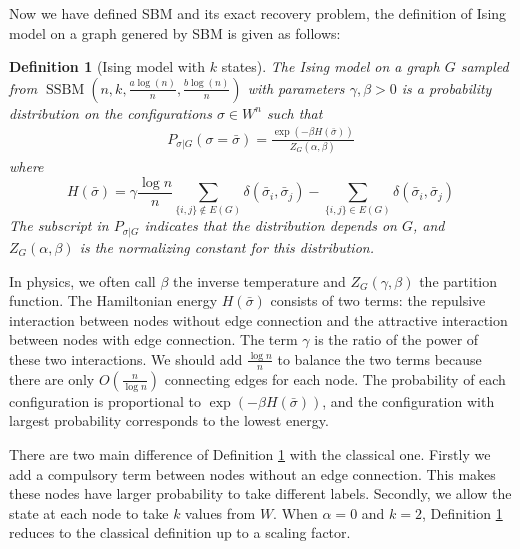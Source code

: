\documentclass[journal]{IEEEtran}
\newtheorem{definition}{Definition}
\newcommand{\A}{\frac{a \log(n)}{n}}
\newcommand{\B}{\frac{b \log(n)}{n}}
\newcommand{\1}{\mathbbm{1}}
\DeclareMathOperator{\SSBM}{SSBM}
\begin{document}
Now we have defined SBM and its exact recovery problem, the definition of Ising model on a graph genered by SBM is given
as follows:
\begin{definition}[Ising model with $k$ states]\label{def:ising}
	The Ising model on a graph $G$ sampled from $\SSBM(n,k,\A,\B)$ with parameters $\gamma,\beta>0$ is a probability distribution on the configurations $\sigma\in W^n$ such that
	\begin{align} \label{eq:isingma}
	P_{\sigma|G}(\sigma=\bar{\sigma})=\frac{\exp(-\beta H(\bar{\sigma}))}{Z_G(\alpha,\beta)}
	\end{align}
	where
	\begin{equation}\label{eq:energy}
	H(\bar{\sigma}) = \gamma \frac{\log n}{n} \sum_{\{i,j\}\not\in E(G)} \delta(\bar{\sigma}_i, \bar{\sigma}_j)
	- \sum_{\{i,j\}\in E(G)} \delta(\bar{\sigma}_i, \bar{\sigma}_j)
	\end{equation}	
	The subscript in $P_{\sigma|G}$ indicates that the distribution depends on $G$, and
	$Z_G(\alpha,\beta)$ is the normalizing constant for this distribution.
\end{definition}
In physics, we often call $\beta$ the inverse temperature and $Z_G(\gamma, \beta)$ the partition function.
The Hamiltonian energy $H(\bar{\sigma})$ consists of two terms: the repulsive interaction between nodes without edge connection
and the attractive interaction between nodes with edge connection. The term $\gamma$ is the ratio of the power of these two
interactions. We should add $\frac{\log n}{n}$ to balance the two terms because there are only $O(\frac{n}{\log n})$
connecting edges for each node.
The probability of each configuration is proportional to $\exp(-\beta H(\bar{\sigma}))$, and the configuration with largest
probability corresponds to the lowest energy.

There are two main difference of Definition \ref{def:ising} with the classical one. Firstly we add a compulsory term
between nodes without an edge connection. This makes these nodes have larger probability to take different labels.
Secondly, we allow the state at each node to take $k$ values from $W$.
When $\alpha = 0$ and $k=2$, Definition \ref{def:ising}
reduces to the classical definition up to a scaling factor.
\end{document}
